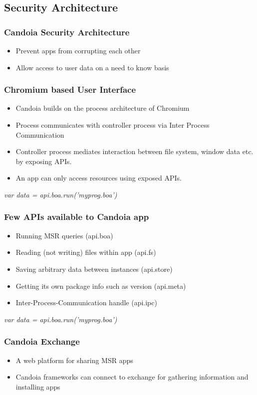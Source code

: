     \subsection{Security Architecture}
        \begin{frame}
            \frametitle{Candoia Security Architecture}
            \begin{itemize}
                \item Prevent apps from corrupting each other
                \item Allow access to user data on a need to know basis
            \end{itemize}
         \end{frame}

        \begin{frame}
            \frametitle{Chromium based User Interface}
            \begin{itemize}
                \item Candoia builds on the process architecture of Chromium
                \item Process communicates with controller process via Inter Process Communication
                \item Controller process mediates interaction between file system, window data etc. by exposing APIs.
                \item An app can only access resources using exposed APIs.
            \end{itemize}
            \emph{var data = api.boa.run('myprog.boa')}
         \end{frame}

        \begin{frame}
            \frametitle{Few APIs available to Candoia app}
            \begin{itemize}
                \item Running MSR queries (api.boa)
                \item Reading (not writing) files within app (api.fs)
                \item Saving arbitrary data between instances (api.store)
                \item Getting its own package info such as version (api.meta)
                \item Inter-Process-Communication handle (api.ipc)
            \end{itemize}
            \emph{var data = api.boa.run('myprog.boa')}
         \end{frame}

        \begin{frame}
            \frametitle{Candoia Exchange}
            \begin{itemize}
                \item A web platform for sharing MSR apps
                \item Candoia frameworks can connect to exchange for gathering information and  installing apps
            \end{itemize}
         \end{frame}